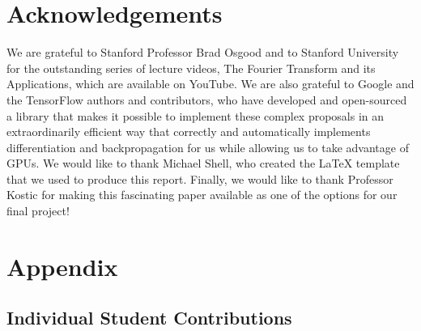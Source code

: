 \documentclass[10pt,journal,compsoc]{IEEEtran}
\begin{document}
\section{Acknowledgements}

We are grateful to Stanford Professor Brad Osgood and to Stanford University for the outstanding series of lecture videos, The Fourier Transform and its Applications, which are available on YouTube. We are also grateful to Google and the TensorFlow authors and contributors, who have developed and open-sourced a library that makes it possible to implement these complex proposals in an extraordinarily efficient way that correctly and automatically implements differentiation and backpropagation for us while allowing us to take advantage of GPUs. We would like to thank Michael Shell, who created the LaTeX template that we used to produce this report. Finally, we would like to thank Professor Kostic for making this fascinating paper available as one of the options for our final project!





\section{Appendix}

\subsection{Individual Student Contributions}
\end{document}

